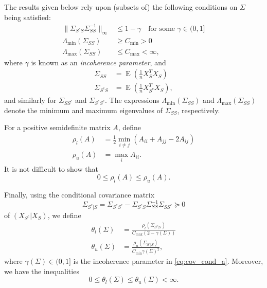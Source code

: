 \documentclass[letterpaper,12pt]{article}
\DeclareMathOperator{\E}{E}
\newcommand{\norm}[1]{\lVert#1\rVert}
\begin{document}
The results given below rely upon (subsets of) the following
conditions on $\Sigma$ being satisfied:
\begin{subequations}
  \begin{align}
    \norm{\Sigma_{S^c S} \Sigma_{SS}^{-1}}_\infty &\leq 1 - \gamma
      \quad \text{for some $\gamma \in (0, 1]$}
      \label{eq:cov_cond_a} \\
    \Lambda_{\mathrm{min}}(\Sigma_{SS}) &\geq C_{\mathrm{min}} > 0
      \label{eq:cov_cond_b} \\
    \Lambda_{\mathrm{max}}(\Sigma_{SS}) &\leq C_{\mathrm{max}} < \infty,
      \label{eq:cov_cond_c}
  \end{align}
\end{subequations}
where $\gamma$ is known as an \textit{incoherence parameter}, and
\begin{align*}
  \Sigma_{SS} &= \E \left ( \frac{1}{n} X_S^T X_S \right ) \\
  \Sigma_{S^c S} &= \E \left ( \frac{1}{n} X_{S^c}^T X_S \right ),
\end{align*}
and similarly for $\Sigma_{SS^c}$ and $\Sigma_{S^c S^c}$. The
expressions $\Lambda_{\mathrm{min}}(\Sigma_{SS})$ and
$\Lambda_{\mathrm{max}}(\Sigma_{SS})$ denote the minimum and maximum
eigenvalues of $\Sigma_{SS}$, respectively.

For a positive semidefinite matrix $A$, define
\begin{align*}
  \rho_l(A) &= \frac{1}{2} \min_{i \neq j} (A_{ii} + A_{jj} - 2A_{ij}) \\
  \rho_u(A) &= \max_i A_{ii}.
\end{align*}
It is not difficult to show that
\begin{equation*}
  0 \leq \rho_l(A) \leq \rho_u(A).
\end{equation*}

Finally, using the conditional covariance matrix
\begin{equation*}
  \Sigma_{S^c | S}
    = \Sigma_{S^c S^c} - \Sigma_{S^c S} \Sigma_{SS}^{-1} \Sigma_{SS^c}
    \succeq 0
\end{equation*}
of $(X_{S^c} | X_S)$, we define
\begin{align*}
  \theta_l(\Sigma) &= \frac{\rho_l(\Sigma_{S^c | S})}
    {C_{\mathrm{max}} (2 - \gamma(\Sigma))} \\
  \theta_u(\Sigma) &= \frac{\rho_u(\Sigma_{S^c | S})}
    {C_{\mathrm{min}} \gamma(\Sigma)^2},
\end{align*}
where $\gamma(\Sigma) \in (0, 1]$ is the incoherence parameter in
\eqref{eq:cov_cond_a}. Moreover, we have the inequalities
\begin{equation*}
  0 \leq \theta_l(\Sigma) \leq \theta_u(\Sigma) < \infty.
\end{equation*}
\end{document}
